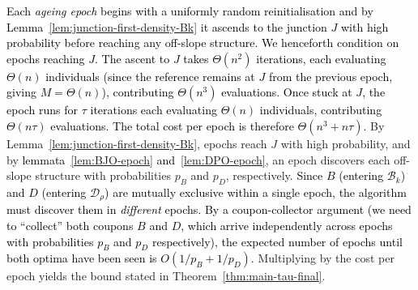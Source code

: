 \documentclass[lettersize,journal]{IEEEtran}
\newcommand{\rerev}[1]{\textcolor{black}{#1}}
\begin{document}
\textcolor{black}{Each \emph{ageing epoch} begins with a uniformly random reinitialisation and by Lemma~\ref{lem:junction-first-density-Bk} it
ascends to the junction $J$ with high probability before reaching any
off-slope structure.  We henceforth condition on epochs reaching $J$.}
\rerev{The ascent to $J$ takes $\Theta(n^2)$ iterations, each evaluating $\Theta(n)$ individuals (since the reference remains at $J$ from the previous epoch, giving $M=\Theta(n)$), contributing $\Theta(n^3)$ evaluations.  Once stuck at $J$, the epoch runs for $\tau$ iterations each evaluating $\Theta(n)$ individuals, contributing $\Theta(n\tau)$ evaluations.  The total cost per epoch is therefore $\Theta(n^3 + n\tau)$.}
By Lemma~\ref{lem:junction-first-density-Bk}, epochs reach $J$ with high probability, and by \textcolor{black}{lemmata~\ref{lem:BJO-epoch} and~\ref{lem:DPO-epoch}}, an epoch discovers each off-slope structure with probabilities $p_B$ and $p_D$, respectively.
\textcolor{black}{Since $B$ (entering $\mathcal{B}_k$) and $D$ (entering $\mathcal{D}_\rho$) are
mutually exclusive within a single epoch, the algorithm must discover them in
\emph{different} epochs.
By a coupon-collector argument (we need to ``collect'' both coupons $B$ and
$D$, which arrive independently across epochs with probabilities $p_B$ and
$p_D$ respectively), the expected number of epochs until both optima have been seen
is $O(1/p_B + 1/p_D)$.}
Multiplying by the cost per epoch yields the bound stated in Theorem~\ref{thm:main-tau-final}.
\end{document}
